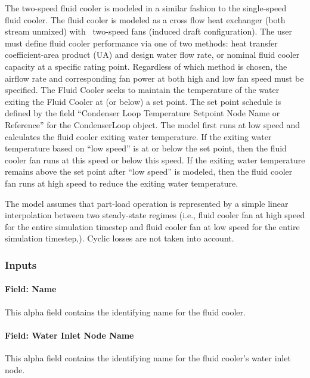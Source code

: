 The two-speed fluid cooler is modeled in a similar fashion to the single-speed fluid cooler. The fluid cooler is modeled as a cross flow heat exchanger (both stream unmixed) with~ two-speed fans (induced draft configuration). The user must define fluid cooler performance via one of two methods: heat transfer coefficient-area product (UA) and design water flow rate, or nominal fluid cooler capacity at a specific rating point. Regardless of which method is chosen, the airflow rate and corresponding fan power at both high and low fan speed must be specified. The Fluid Cooler seeks to maintain the temperature of the water exiting the Fluid Cooler at (or below) a set point. The set point schedule is defined by the field ``Condenser Loop Temperature Setpoint Node Name or Reference'' for the CondenserLoop object. The model first runs at low speed and calculates the fluid cooler exiting water temperature. If the exiting water temperature based on ``low speed'' is at or below the set point, then the fluid cooler fan runs at this speed or below this speed. If the exiting water temperature remains above the set point after ``low speed'' is modeled, then the fluid cooler fan runs at high speed to reduce the exiting water temperature.

The model assumes that part-load operation is represented by a simple linear interpolation between two steady-state regimes (i.e., fluid cooler fan at high speed for the entire simulation timestep and fluid cooler fan at low speed for the entire simulation timestep,). Cyclic losses are not taken into account.

\subsubsection{Inputs}\label{inputs-9-003}

\paragraph{Field: Name}\label{field-name-8-003}

This alpha field contains the identifying name for the fluid cooler.

\paragraph{Field: Water Inlet Node Name}\label{field-water-inlet-node-name-6}

This alpha field contains the identifying name for the fluid cooler's water inlet node.

